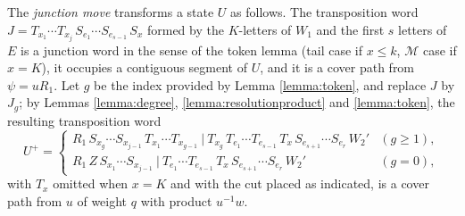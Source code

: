 \documentclass{amsart}
\theoremstyle{definition}
\theoremstyle{remark}
\numberwithin{equation}{section}
\begin{document}
The \emph{junction move} transforms a state $U$ as follows. The transposition word $J=T_{x_1}\cdots T_{x_j}\,S_{e_1}\cdots S_{e_{s-1}}\,S_x$ formed by the $K$-letters of $W_1$ and the first $s$ letters of $E$ is a junction word in the sense of the token lemma (tail case if $x\leq k$, $\mathcal M$ case if $x=K$), it occupies a contiguous segment of $U$, and it is a cover path from $\psi=uR_1$. Let $g$ be the index provided by Lemma \ref{lemma:token}, and replace $J$ by $J_g$; by Lemmas \ref{lemma:degree}, \ref{lemma:resolutionproduct} and \ref{lemma:token}, the resulting transposition word
$$U^+=\begin{cases}R_1\,S_{x_g}\cdots S_{x_{j-1}}\,T_{x_1}\cdots T_{x_{g-1}}\ \big|\ T_{x_g}\,T_{e_1}\cdots T_{e_{s-1}}\,T_x\,S_{e_{s+1}}\cdots S_{e_r}\,W_2'&(g\geq1),\\[3pt]
R_1\,Z\,S_{x_1}\cdots S_{x_{j-1}}\ \big|\ T_{e_1}\cdots T_{e_{s-1}}\,T_x\,S_{e_{s+1}}\cdots S_{e_r}\,W_2'&(g=0),\end{cases}$$
with $T_x$ omitted when $x=K$ and with the cut placed as indicated, is a cover path from $u$ of weight $q$ with product $u^{-1}w$.
\end{document}
